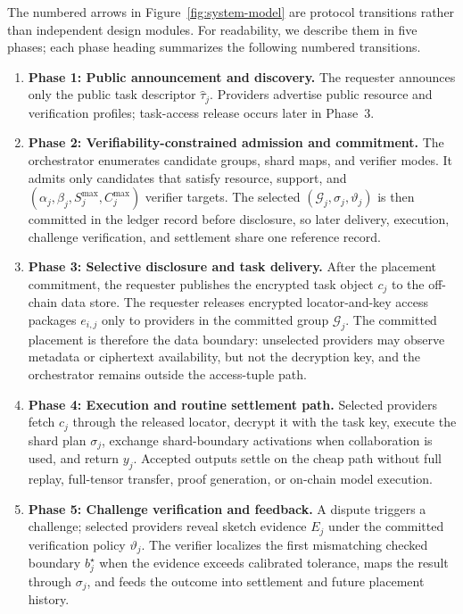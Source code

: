 \documentclass[sigplan,screen,review,anonymous]{acmart}
\newcommand{\workflowstep}[1]{%
	\tikz[baseline=(n.base)]{
		\node[circle,fill=black,text=white,inner sep=0pt,
		minimum size=0.95em,font=\scriptsize\bfseries] (n) {#1};
	}%
}
\begin{document}
The numbered arrows in Figure~\ref{fig:system-model} are protocol
transitions rather than independent design modules. For readability, we
describe them in five phases; each phase heading summarizes the following
numbered transitions.

\begin{enumerate}[leftmargin=0pt,label={},labelsep=0pt,itemindent=0pt,nosep]
	\item \textbf{Phase 1: Public announcement and discovery.}
	\workflowstep{1} The requester announces only the public task descriptor
	\(\widehat{\tau}_j\). \workflowstep{2} Providers advertise public resource
	and verification profiles; task-access release occurs later in Phase~3.

	\item \textbf{Phase 2: Verifiability-constrained admission and commitment.}
	\workflowstep{3} The orchestrator enumerates candidate groups, shard maps,
	and verifier modes. It admits only candidates that satisfy resource,
	support, and \((\alpha_j,\beta_j,S^{\max}_j,C^{\max}_j)\) verifier targets.
	The selected
	\((\mathcal{G}_j,\sigma_j,\vartheta_j)\) is then committed in the ledger
	record before disclosure, so later delivery, execution,
	challenge verification, and settlement share one reference record.

	\item \textbf{Phase 3: Selective disclosure and task delivery.}
	\workflowstep{4} After the placement commitment, the requester publishes
	the encrypted task object \(c_j\) to the off-chain data store.
	\workflowstep{5} The requester releases encrypted locator-and-key access
	packages \(e_{i,j}\) only to providers in the committed group
	\(\mathcal{G}_j\). The committed placement is therefore the data boundary:
	unselected providers may observe metadata or ciphertext availability, but
	not the decryption key, and the orchestrator remains outside the
	access-tuple path.

	\item \textbf{Phase 4: Execution and routine settlement path.}
	\workflowstep{6} Selected providers fetch \(c_j\) through the released
	locator, decrypt it with the task key, execute the shard plan
	\(\sigma_j\), exchange shard-boundary activations when collaboration is
	used, and return \(y_j\). Accepted outputs settle on the cheap path without
	full replay, full-tensor transfer, proof generation, or on-chain model
	execution.

	\item \textbf{Phase 5: Challenge verification and feedback.}
	\workflowstep{7} A dispute triggers a challenge; selected providers reveal
	sketch evidence \(E_j\) under the committed verification policy
	\(\vartheta_j\).
	\workflowstep{8} The verifier localizes the first mismatching checked
	boundary \(b^\star_j\) when the evidence exceeds calibrated tolerance,
	maps the result through \(\sigma_j\), and feeds the outcome into
	settlement and future placement history.
\end{enumerate}
\end{document}

